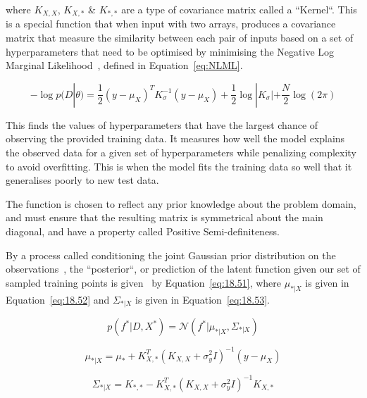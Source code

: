 \documentclass[12pt]{article}
\begin{document}
    where $K_{X,X}$, $K_{X,*}$ \& $K_{*,*}$ are a type of covariance matrix called a ``Kernel``.
    This is a special function that when input with two arrays, produces a covariance matrix that measure the similarity between each pair of inputs based on a set of hyperparameters that need to be optimised by minimising the Negative Log Marginal Likelihood~\cite{murphy2023probabilistic}, defined in Equation~\ref{eq:NLML}.

    \begin{equation}
        -\log p(D|\theta) = \frac{1}{2} (y - \mu_X)^T K_{\sigma}^{-1} (y - \mu_X) + \frac{1}{2} \log |K_{\sigma}| + \frac{N}{2} \log(2\pi)\label{eq:NLML}
    \end{equation}

    This finds the values of hyperparameters that have the largest chance of observing the provided training data.
    It measures how well the model explains the observed data for a given set of hyperparameters while penalizing complexity to avoid overfitting.
    This is when the model fits the training data so well that it generalises poorly to new test data.

    The function is chosen to reflect any prior knowledge about the problem domain, and must ensure that the resulting matrix is symmetrical about the main diagonal, and have a property called Positive Semi-definiteness.


    By a process called conditioning the joint Gaussian prior distribution on the observations~\cite{rasmussen2006gaussian}, the ``posterior``, or prediction of the latent function given our set of sampled training points is given~\cite{murphy2023probabilistic} by Equation~\ref{eq:18.51}, where $\mu_{*|X}$ is given in Equation~\ref{eq:18.52} and $\Sigma_{*|X}$ is given in Equation~\ref{eq:18.53}.

    \begin{equation}
        p(f^* | D, X^*) = \mathcal{N}(f^* | \mu_{*|X}, \Sigma_{*|X})\label{eq:18.51}
    \end{equation}

    \begin{equation}
        \mu_{*|X} = \mu_* + K_{X,*}^T (K_{X,X} + \sigma^2_y I)^{-1} (y - \mu_X)\label{eq:18.52}
    \end{equation}

    \begin{equation}
        \Sigma_{*|X} = K_{*,*} - K_{X,*}^T (K_{X,X} + \sigma^2_y I)^{-1} K_{X,*}\label{eq:18.53}
    \end{equation}
\end{document}
